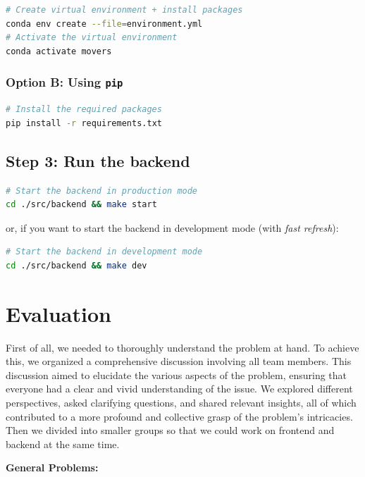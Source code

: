 \documentclass[a4paper, 11pt]{article}
\begin{document}
\begin{lstlisting}[language=bash]
# Create virtual environment + install packages
conda env create --file=environment.yml
# Activate the virtual environment
conda activate movers
\end{lstlisting}

\subsubsection*{Option B: Using \texttt{pip}}

\begin{lstlisting}[language=bash]
# Install the required packages
pip install -r requirements.txt
\end{lstlisting}

\subsection{Step 3: Run the backend}

\begin{lstlisting}[language=bash]
# Start the backend in production mode
cd ./src/backend && make start
\end{lstlisting}

or, if you want to start the backend in development mode (with \textit{fast refresh}):

\begin{lstlisting}[language=bash]
# Start the backend in development mode
cd ./src/backend && make dev
\end{lstlisting}

\pagebreak

\section{Evaluation}

First of all, we needed to thoroughly understand the problem at hand. To achieve this, we organized a comprehensive discussion involving all team members. This discussion aimed to elucidate the various aspects of the problem, ensuring that everyone had a clear and vivid understanding of the issue. We explored different perspectives, asked clarifying questions, and shared relevant insights, all of which contributed to a more profound and collective grasp of the problem's intricacies. Then we divided into smaller groups so that we could work on frontend and backend at the same time.

\textbf{General Problems:}
\end{document}
